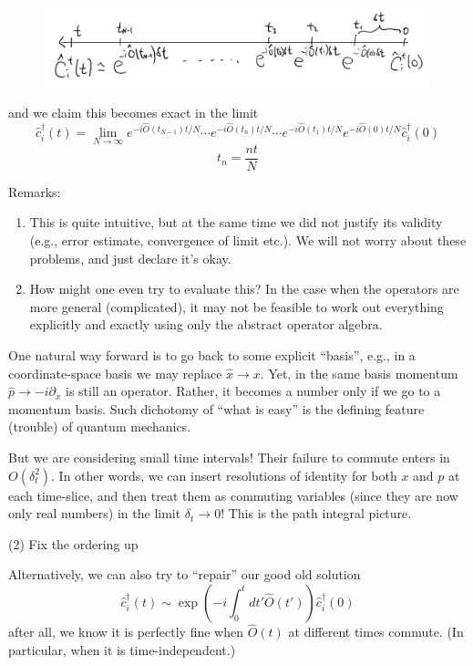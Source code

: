 \begin{figure}[ht]
    \centering
    \includegraphics[width=\textwidth]{jupyterbook/data/fig/lec08-fig00.png}
\end{figure}

and we claim this becomes exact in the limit
\[ \hat{c}_{i}^{\dagger}\left( t \right) =\lim_{N\rightarrow \infty} e^{-i\hat{O}\left( t_{N-1} \right) t/N}\cdots e^{-i\hat{O}\left( t_n \right) t/N}\cdots e^{-i\hat{O}\left( t_1 \right) t/N}e^{-i\hat{O}\left( 0 \right) t/N}\hat{c}_{i}^{\dagger}\left( 0 \right) \]
\[ t_n=\frac{nt}{N}\]

Remarks:

\begin{enumerate}
    \item This is quite intuitive, but at the same time we did not justify its validity (e.g., error estimate, convergence of limit etc.). We will not worry about these problems, and just declare it's okay.
    \item How might one even try to evaluate this? In the case when the operators are more general (complicated), it may not be feasible to work out everything explicitly and exactly using only the abstract operator algebra.
\end{enumerate}

One natural way forward is to go back to some explicit ``basis'', e.g., in a coordinate-space basis we may replace $\hat{x}\to x$. Yet, in the same basis momentum $\hat{p}\to -i\partial_x$ is still an operator. Rather, it becomes a number only if we go to a momentum basis. Such dichotomy of ``what is easy'' is the defining feature (trouble) of quantum mechanics.

But we are considering small time intervals! Their failure to commute enters in $O(\delta_t^2)$. In other words, we can insert resolutions of identity for both $x$ and $p$ at each time-slice, and then treat them as commuting variables (since they are now only real numbers) in the limit $\delta_t\to 0$! This is the path integral picture.

(2) Fix the ordering up

Alternatively, we can also try to ``repair'' our good old solution
\[ \hat{c}_{i}^{\dagger}\left( t \right) \sim \exp \left( -i\int_0^t{dt'\hat{O}\left( t' \right)} \right) \hat{c}_{i}^{\dagger}\left( 0 \right) \]
after all, we know it is perfectly fine when $\hat{O}(t)$ at different times commute. (In particular, when it is time-independent.)

